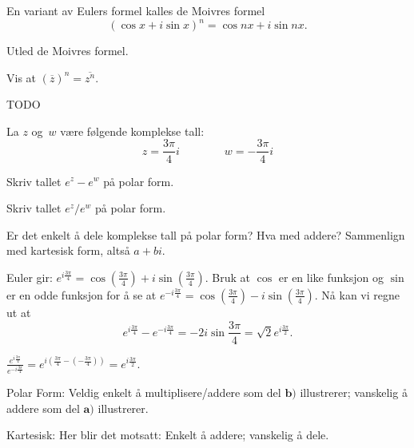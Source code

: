 \begin{oppgave}
En variant av Eulers formel kalles de Moivres formel
\[
(\cos x + i\sin x)^n=\cos nx + i\sin nx.
\]
\begin{punkt}
Utled de Moivres formel.
\end{punkt}

\begin{punkt}
Vis at $(\overline z)^n=\overline{z^n}$.
\end{punkt}
\end{oppgave}


\begin{losning}
TODO
\end{losning}


\begin{oppgave}
La $z$ og~$w$ være følgende komplekse tall:
\[
z = \frac{3\pi}{4} i
\qquad\qquad
w = -\frac{3\pi}{4}i
\]
\begin{punkt}
Skriv tallet $e^z - e^w$ på polar form.
\end{punkt}

\begin{punkt}
Skriv tallet $e^z/e^w$ på polar form.
\end{punkt}

\begin{punkt}
Er det enkelt å dele komplekse tall på polar form?
Hva med addere?
Sammenlign med kartesisk form, altså $a + bi$.
\end{punkt}

\end{oppgave}

\begin{losning}

\begin{punkt}
Euler gir: $e^{i\frac{3\pi}{4}}=\cos(\frac{3\pi}{4})+i\sin (\frac{3\pi}{4})$. Bruk at $\cos$ er en like funksjon og $\sin$ er en odde funksjon for å se at $e^{-i\frac{3\pi}{4}}=\cos(\frac{3\pi}{4})-i\sin (\frac{3\pi}{4})$. Nå kan vi regne ut at $$e^{i\frac{3\pi}{4}}-e^{-i\frac{3 \pi}{4}}=-2i\sin \frac{3\pi}{4}=\sqrt{2}e^{i\frac{3\pi}{2}}.$$
\end{punkt}

\begin{punkt}
$\frac{e^{i\frac{3\pi}{4}}}{e^{-i\frac{3 \pi}{4}}}=e^{i(\frac{3\pi}{4}-(-\frac{3 \pi}{4}))}=e^{i\frac{3\pi}{2}}.$ 
\end{punkt}

\begin{punkt}
Polar Form: Veldig enkelt å multiplisere/addere som del $\textbf{b)}$ illustrerer; vanskelig å addere som del $\textbf{a)}$ illustrerer.

\noindent
Kartesisk: Her blir det motsatt: Enkelt å addere; vanskelig å dele.
\end{punkt}

\end{losning}



